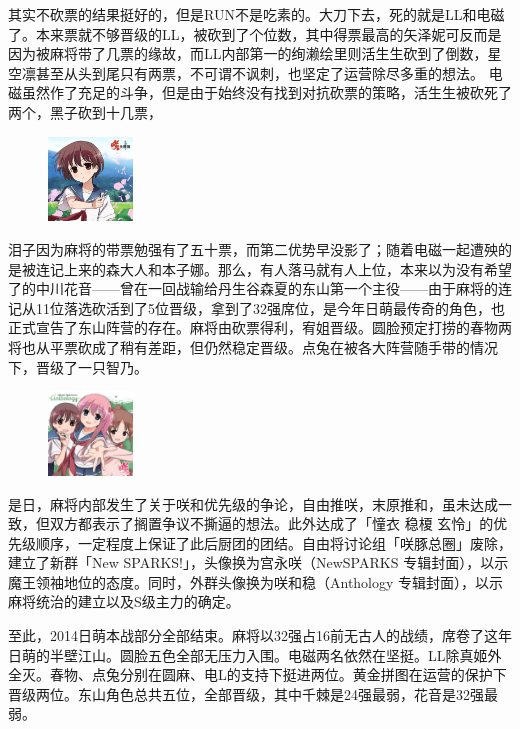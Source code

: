 其实不砍票的结果挺好的，但是RUN不是吃素的。大刀下去，死的就是LL和电磁了。本来票就不够晋级的LL，被砍到了个位数，其中得票最高的矢泽妮可反而是因为被麻将带了几票的缘故，而LL内部第一的绚濑绘里则活生生砍到了倒数，星空凛甚至从头到尾只有两票，不可谓不讽刺，也坚定了运营除尽多重的想法。
电磁虽然作了充足的斗争，但是由于始终没有找到对抗砍票的策略，活生生被砍死了两个，黑子砍到十几票，\begin{figure}
\includegraphics[width=0.2\textwidth]{images/NewSPARKS.jpg}
\end{figure}泪子因为麻将的带票勉强有了五十票，而第二优势早没影了；随着电磁一起遭殃的是被连记上来的森大人和本子娜。那么，有人落马就有人上位，本来以为没有希望了的中川花音——曾在一回战输给丹生谷森夏的东山第一个主役——由于麻将的连记从11位落选砍活到了5位晋级，拿到了32强席位，是今年日萌最传奇的角色，也正式宣告了东山阵营的存在。麻将由砍票得利，宥姐晋级。圆脸预定打捞的春物两将也从平票砍成了稍有差距，但仍然稳定晋级。点兔在被各大阵营随手带的情况下，晋级了一只智乃。

\begin{figure}
  \includegraphics[width=0.2\textwidth]{images/Anthology.jpg}
\end{figure}

是日，麻将内部发生了关于咲和优先级的争论，自由推咲，末原推和，虽未达成一致，但双方都表示了搁置争议不撕逼的想法。此外达成了「憧衣 稳榎 玄怜」的优先级顺序，一定程度上保证了此后厨团的团结。自由将讨论组「咲豚总圈」废除，建立了新群「New SPARKS!」，头像换为宫永咲（NewSPARKS 专辑封面），以示魔王领袖地位的态度。同时，外群头像换为咲和稳（Anthology 专辑封面），以示麻将统治的建立以及S级主力的确定。

至此，2014日萌本战部分全部结束。麻将以32强占16前无古人的战绩，席卷了这年日萌的半壁江山。圆脸五色全部无压力入围。电磁两名依然在坚挺。LL除真姬外全灭。春物、点兔分别在圆麻、电L的支持下挺进两位。黄金拼图在运营的保护下晋级两位。东山角色总共五位，全部晋级，其中千棘是24强最弱，花音是32强最弱。

